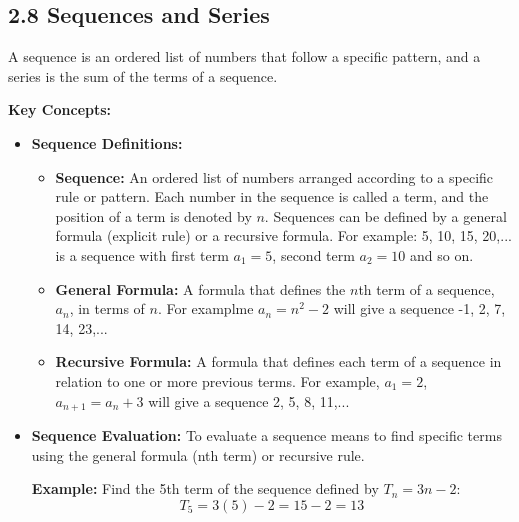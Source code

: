 
\subsection*{2.8 Sequences and Series}
A sequence is an ordered list of numbers that follow a specific pattern, and a series is the sum of the terms of a sequence.

\textbf{Key Concepts:}
\begin{itemize}
    \item \textbf{Sequence Definitions:}
    \begin{itemize}
        \item \textbf{Sequence:} An ordered list of numbers arranged according to a specific rule or pattern. Each number in the sequence is called a term, and the position of a term is denoted by $n$. Sequences can be defined by a general formula (explicit rule) or a recursive formula. For example: 5, 10, 15, 20,... is a sequence with first term $a_1 = 5$, second term $a_2 = 10$ and so on.

        \item \textbf{General Formula:} A formula that defines the $n$th term of a sequence, $a_n$, in terms of $n$. For examplme $a_n=n^2-2$ will give a sequence -1, 2, 7, 14, 23,...
        \item \textbf{Recursive Formula:} A formula that defines each term of a sequence in relation to one or more previous terms. For example, $a_1 = 2$, $a_{n+1} = a_n + 3$ will give a sequence 2, 5, 8, 11,...
    \end{itemize}
    \item \textbf{Sequence Evaluation:}  
To evaluate a sequence means to find specific terms using the general formula (nth term) or recursive rule. 

\textbf{Example:}  
Find the 5th term of the sequence defined by \(T_n = 3n - 2\):  
\[
T_5 = 3(5) - 2 = 15 - 2 = 13
\]


\end{itemize}
